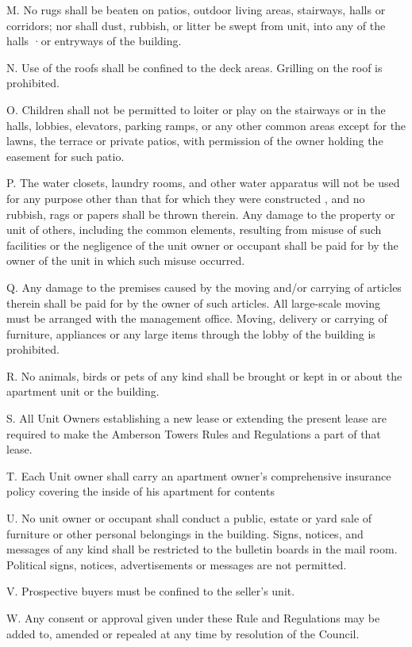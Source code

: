 \documentclass[
]{book}
\begin{document}
M. No rugs shall be beaten on patios, outdoor living areas, stairways, halls or corridors; nor shall dust, rubbish, or litter be swept from unit, into any of the halls ·or entryways of the building.

N. Use of the roofs shall be confined to the deck areas. Grilling on the roof is prohibited.

O. Children shall not be permitted to loiter or play on the stairways or in the halls, lobbies, elevators, parking ramps, or any other common areas except for the lawns, the terrace or private patios, with permission of the owner holding the easement for such patio.

P. The water closets, laundry rooms, and other water apparatus will not be used for any purpose other than that for which they were constructed , and no rubbish, rags or papers shall be thrown therein. Any damage to the property or unit of others, including the common elements, resulting from misuse of such facilities or the negligence of the unit owner or occupant shall be paid for by the owner of the unit in which such misuse occurred.

Q. Any damage to the premises caused by the moving and/or carrying of articles therein shall be paid for by the owner of such articles. All large-scale moving must be arranged with the management office. Moving, delivery or carrying of furniture, appliances or any large items through the lobby of the building is prohibited.

R. No animals, birds or pets of any kind shall be brought or kept in or about the apartment unit or the building.

S. All Unit Owners establishing a new lease or extending the present lease are required to make the Amberson Towers Rules and Regulations a part of that lease.

T. Each Unit owner shall carry an apartment owner's comprehensive insurance policy covering the inside of his apartment for contents

U. No unit owner or occupant shall conduct a public, estate or yard sale of furniture or other personal belongings in the building. Signs, notices, and messages of any kind shall be restricted to the bulletin boards in the mail room. Political signs, notices, advertisements or messages are not permitted.

V. Prospective buyers must be confined to the seller's unit.

W. Any consent or approval given under these Rule and Regulations may be added to, amended or repealed at any time by resolution of the Council.
\end{document}
